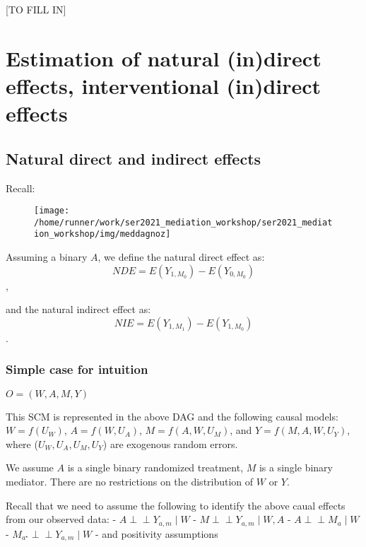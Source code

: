 \documentclass[
  12pt, krantz2,
]{book}
\theoremstyle{definition}
\theoremstyle{definition}
\theoremstyle{definition}
\newcommand{\indep}{\mbox{$\perp\!\!\!\perp$}}
\newcommand{\1}{\mathbbm{1}}
\begin{document}
{[}TO FILL IN{]}

\hypertarget{estimation-of-natural-indirect-effects-interventional-indirect-effects}{%
\chapter{Estimation of natural (in)direct effects, interventional (in)direct effects}\label{estimation-of-natural-indirect-effects-interventional-indirect-effects}}

\hypertarget{natural-direct-and-indirect-effects-1}{%
\section{Natural direct and indirect effects}\label{natural-direct-and-indirect-effects-1}}

Recall:

\begin{figure}

{\centering \texttt{[image: /home/runner/work/ser2021\_mediation\_workshop/ser2021\_mediation\_workshop/img/meddagnoz]} 

}

\end{figure}

Assuming a binary \(A\), we define the natural direct effect as:
\[NDE = E(Y_{1,M_{0}}) - E(Y_{0,M_{0}})\],

and the natural indirect effect as:
\[NIE = E(Y_{1,M_{1}}) - E(Y_{1,M_{0}})\].

\hypertarget{simple-case-for-intuition}{%
\subsection{Simple case for intuition}\label{simple-case-for-intuition}}

\(O=(W, A, M, Y)\)

This SCM is represented in the above DAG and the following causal models:
\(W=f(U_W)\), \(A=f(W,U_A)\), \(M=f(A, W,U_M)\), and \(Y=f(M,A,W,U_Y)\), where (\(U_W, U_A,U_M, U_Y\)) are exogenous random errors.

We assume \(A\) is a single binary randomized treatment, \(M\) is a single binary
mediator. There are no restrictions on the distribution of \(W\) or \(Y\).

Recall that we need to assume the following to identify the above caual effects
from our observed data:
- \(A \indep Y_{a,m} \mid W\)
- \(M \indep Y_{a,m} \mid W, A\)
- \(A \indep M_a \mid W\)
- \(M_{a^{\star}} \indep Y_{a,m} \mid W\)
- and positivity assumptions
\end{document}

